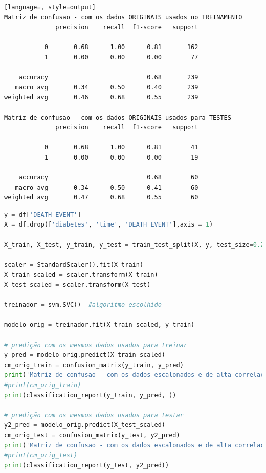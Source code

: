 \begin{lstlisting}[language=, style=output]
Matriz de confusao - com os dados ORIGINAIS usados no TREINAMENTO
              precision    recall  f1-score   support

           0       0.68      1.00      0.81       162
           1       0.00      0.00      0.00        77

    accuracy                           0.68       239
   macro avg       0.34      0.50      0.40       239
weighted avg       0.46      0.68      0.55       239

Matriz de confusao - com os dados ORIGINAIS usados para TESTES
              precision    recall  f1-score   support

           0       0.68      1.00      0.81        41
           1       0.00      0.00      0.00        19

    accuracy                           0.68        60
   macro avg       0.34      0.50      0.41        60
weighted avg       0.47      0.68      0.55        60
\end{lstlisting}


\begin{lstlisting}[language=Python, style=input]
y = df['DEATH_EVENT']
X = df.drop(['diabetes', 'time', 'DEATH_EVENT'],axis = 1)

X_train, X_test, y_train, y_test = train_test_split(X, y, test_size=0.20, stratify=y_orig,random_state=10)

scaler = StandardScaler().fit(X_train)
X_train_scaled = scaler.transform(X_train)
X_test_scaled = scaler.transform(X_test)

treinador = svm.SVC()  #algoritmo escolhido

modelo_orig = treinador.fit(X_train_scaled, y_train)

# predição com os mesmos dados usados para treinar
y_pred = modelo_orig.predict(X_train_scaled)
cm_orig_train = confusion_matrix(y_train, y_pred)
print('Matriz de confusao - com os dados escalonados e de alta correlacao usados no TREINAMENTO')
#print(cm_orig_train)
print(classification_report(y_train, y_pred, ))

# predição com os mesmos dados usados para testar
y2_pred = modelo_orig.predict(X_test_scaled)
cm_orig_test = confusion_matrix(y_test, y2_pred)
print('Matriz de confusao - com os dados escalonados e de alta correlacao usados no TESTE')
#print(cm_orig_test)
print(classification_report(y_test, y2_pred))
\end{lstlisting}


